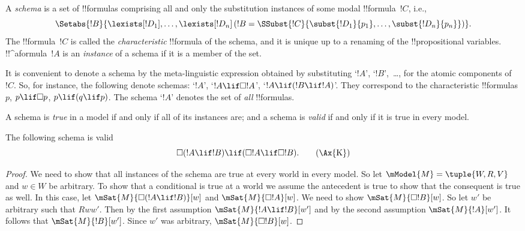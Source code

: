 \documentclass[../../../include/open-logic-section]{subfiles}
\begin{document}


\begin{defn}
  A \emph{schema} is a set of !!{formula}s comprising all
  and only the substitution instances of some modal !!{formula}~$!C$, i.e.,
  \[
  \Setabs{!B}{\lexists[!D_1], \dots, \lexists[!D_n] \left(!B =
  \SSubst{!C}{\subst{!D_1}{p_1}, \dots, \subst{!D_n}{p_n}} \right) }.
  \]
  The !!{formula}~$!C$ is called the \emph{characteristic} !!{formula} of
  the schema, and it is unique up to a renaming of the !!{propositional
  variable}s. !!^a{formula}~$!A$ is an \emph{instance} of a schema if
  it is a member of the set.
\end{defn}

It is convenient to denote a schema by the meta-linguistic expression
obtained by substituting `$!A$', `$!B$',~\dots, for the atomic
components of~$!C$. So, for instance, the following denote schemas:
`$!A$', `$!A \lif \Box!A$', `$!A \lif (!B \lif !A)$'. They correspond
to the characteristic !!{formula}s $p$, $p \lif \Box p$, $p \lif (q
\lif p)$. The schema `$!A$' denotes the set of \emph{all}
!!{formula}s.

\begin{defn}
  A schema is \emph{true} in a model if and only if all of its instances
  are; and a schema is \emph{valid} if and only if it is true in every
  model.
\end{defn}

\begin{prop}
  The following schema  is valid
  \begin{equation*}
  \Box(!A \lif !B) \lif (\Box !A \lif \Box !B). \tag{\Ax{K}}
  \end{equation*}
\end{prop}

\begin{proof}
  We need to show that all instances of the schema are true at every
  world in every model. So let $\mModel{M} = \tuple{W,R,V}$ and $w \in
  W$ be arbitrary. To show that a conditional is true at a world we
  assume the antecedent is true to show that the consequent is true as
  well. In this case, let $\mSat{M}{\Box(!A \lif !B)}[w]$ and
  $\mSat{M}{\Box !A}[w]$. We need to show $\mSat{M}{\Box !B}[w]$. So let
  $w'$ be arbitrary such that $Rww'$. Then by the first assumption
  $\mSat{M}{!A \lif !B}[w']$ and by the second assumption
  $\mSat{M}{!A}[w']$. It follows that $\mSat{M}{!B}[w']$. Since $w'$
  was arbitrary, $\mSat{M}{\Box !B}[w]$.
\end{proof}
\end{document}
